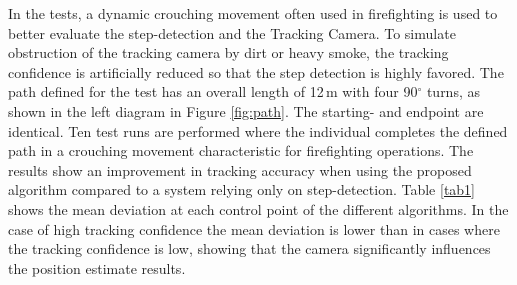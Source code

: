 \documentclass[engproc,conferenceproceedings,submit,pdftex,moreauthors]{Definitions/mdpi}
\begin{document}
In the tests, a dynamic crouching movement often used in firefighting is used to better evaluate the step-detection and the Tracking Camera. To simulate obstruction of the tracking camera by dirt or heavy smoke, the tracking confidence is artificially reduced so that the step detection is highly favored. The path defined for the test has an overall length of 12\,m with four 90$^\circ$ turns, as shown in the left diagram in Figure \ref{fig:path}. The starting- and endpoint are identical. Ten test runs are performed where the individual completes the defined path in a crouching movement characteristic for firefighting operations. The results show an improvement in tracking accuracy when using the proposed algorithm compared to a system relying only on step-detection. Table \ref{tab1} shows the mean deviation at each control point of the different algorithms. In the case of high tracking confidence the mean deviation is lower than in cases where the tracking confidence is low, showing that the camera significantly influences the position estimate results. 
\end{document}
